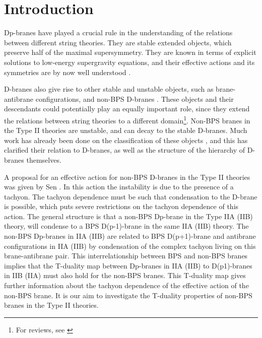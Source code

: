 \documentclass[12pt,a4paper]{article}
\begin{document}
\newpage

\pagestyle{plain}

\setcounter{section}{0}
\section{Introduction}

Dp-branes \cite{Po} have played a crucial rule in the understanding of
 the relations between different string theories. They are stable extended
 objects, which preserve half of the maximal supersymmetry. They are
 known in terms of explicit solutions to low-energy supergravity equations,
 and their effective actions and its symmetries are by now well
 understood \cite{Po2}.

D-branes also give rise to other stable and
 unstable objects, such as brane-antibrane configurations, and
 non-BPS D-branes  \cite{Sen1,Sen2,Sen3}.
 These objects and their descendants
 could potentially play an equally important role, since
 they extend the relations between string theories to a different
 domain\footnote{For reviews, see \cite{Sen4,Lerda, S1}}.
 Non-BPS branes in  the Type II theories are unstable,
 and can decay to the stable
 D-branes. Much work has already been done on the classification of these
 objects \cite{Wit1,Ho1},
 and this has clarified their relation to D-branes, as well
 as the structure of the hierarchy of D-branes themselves.

A proposal for an effective action for non-BPS D-branes in the Type II
 theories was given by Sen \cite{Sen5}.
 In this action the instability is due to the presence of a tachyon. The
 tachyon dependence must be such that condensation to the D-brane is
 possible, which puts severe restrictions on the tachyon dependence
 of this action. The general structure is that a non-BPS Dp-brane in
 the Type IIA (IIB) theory, will condense to a BPS
 D(p-1)-brane in the same IIA (IIB) theory. The non-BPS Dp-branes
 in IIA (IIB)  are related to BPS D(p+1)-brane and antibrane configurations
 in IIA (IIB) by condensation of the complex tachyon living on this
 brane-antibrane pair. This interrelationship between BPS and non-BPS branes
 implies that the T-duality map between Dp-branes in IIA (IIB) to
 D(p\myHighlight{$\pm$}\coordHE{}1)-branes in IIB (IIA) must also hold for the non-BPS branes.
 This T-duality map gives further information about the tachyon dependence
 of the effective action of the non-BPS brane. It is our aim to investigate
 the T-duality properties of non-BPS branes in the Type II theories.
\end{document}
